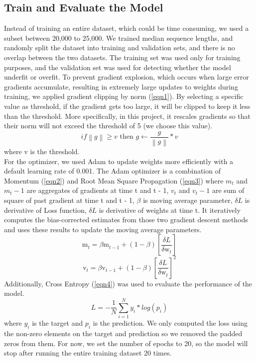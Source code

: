 \documentclass[conference]{IEEEtran}
\begin{document}
\subsection{Train and Evaluate the Model}
Instead of training an entire dataset, which could be time consuming, we used a subset between 20,000 to 25,000. We trained median sequence lengths, and randomly split the dataset into training and validation sets, and there is no overlap between the two datasets. The training set was used only for training purposes, and the validation set was used for detecting whether the model underfit or overfit. To prevent gradient explosion, which occurs when large error gradients accumulate, resulting in extremely large updates to weights during training, we applied gradient clipping by norm (\ref{eqn1}). By selecting a specific value as threshold, if the gradient gets too large, it will be clipped to keep it less than the threshold. More specifically, in this project, it rescales gradients so that their norm will not exceed the threshold of 5 (we choose this value).
\begin{equation}
    \label{eqn1}
    if \left\| g \right\| \ge v \text{ then } g \gets \frac{g}{\left\| g \right\|}*v
\end{equation}    
where v is the threshold. \\
For the optimizer, we used Adam to update weights more efficiently with a default learning rate of 0.001.
The Adam optimizer is a combination of Momentum (\ref{eqn2}) and Root Mean Square Propagation (\ref{eqn3}) where $m_t$ and $m_t-1$ are aggregates of gradients at time t and t - 1, $v_t$ and $v_t-1$ are sum of square of past gradient at time t and t - 1, $\beta$ is moving average parameter, $\delta L$ is derivative of Loss function, $\delta L$ is derivative of weights at time t. It iteratively computes the bias-corrected estimates from those two gradient descent methods and uses these results to update the moving average parameters.
\begin{equation}
    \label{eqn2}
    \mathrm{m}_{t}^{} = \beta\mathrm{m}_{t-1}^{} + (1-\beta)\left[ \frac{\delta L}{\delta \mathrm{w}_{t}^{}} \right]
\end{equation}    
\begin{equation}
    \label{eqn3}
    \mathrm{v}_{t}^{} = \beta\mathrm{v}_{t-1}^{} + (1-\beta)\left[ \frac{\delta L}{\delta \mathrm{w}_{t}^{}} \right]^2
\end{equation}    
 Additionally, Cross Entropy (\ref{eqn4}) was used to evaluate the performance of the model. 
\begin{equation}
    \label{eqn4}
    L = - \dfrac{1}{N} \sum_{i = 1}^{N} y_i * log(p_i)
\end{equation}    
where $y_i$ is the target and $p_i$ is the prediction. We only computed the loss using the non-zero elements on the target and prediction so we removed the padded zeros from them. 
For now, we set the number of epochs to 20, so the model will stop after running the entire training dataset 20 times.  
\end{document}
